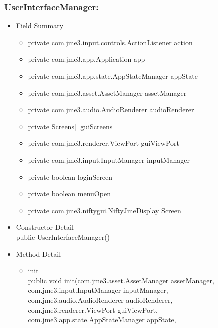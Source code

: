 \documentclass[letterpaper]{article}
\begin{document}
						\subsubsection*{UserInterfaceManager:}
						\vspace{0.1in}	
							\begin{itemize}
								\item	Field Summary
										\begin{itemize}
											\item	private com.jme3.input.controls.ActionListener	action 
											\item	private com.jme3.app.Application	app 
											\item	private com.jme3.app.state.AppStateManager	appState 
											\item	private com.jme3.asset.AssetManager	assetManager 
											\item	private com.jme3.audio.AudioRenderer	audioRenderer 
											\item	private Screens[]	guiScreens 
											\item	private com.jme3.renderer.ViewPort	guiViewPort 
											\item	private com.jme3.input.InputManager	inputManager 
											\item	private boolean	loginScreen 
											\item	private boolean	menuOpen 
											\item	private com.jme3.niftygui.NiftyJmeDisplay	Screen 
										\end{itemize}
								\item	Constructor Detail \\
										public UserInterfaceManager()
								\item	Method Detail
										\begin{itemize}
											\item	init \\
													public void init(com.jme3.asset.AssetManager assetManager, \\
				        com.jme3.input.InputManager inputManager, \\
				        com.jme3.audio.AudioRenderer audioRenderer, \\
				        com.jme3.renderer.ViewPort guiViewPort, \\
				        com.jme3.app.state.AppStateManager appState, \\

\end{itemize}
\end{itemize}
\end{document}
